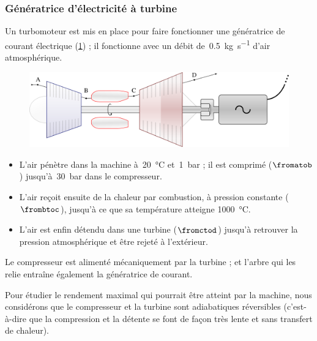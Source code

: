 \subsubsection{Génératrice d’électricité à turbine}
\label{exo_generatrice_electricite_turbine}

	Un turbomoteur est mis en place pour faire fonctionner une génératrice de courant électrique (\cref{fig_exo_turbomoteur}) ; il fonctionne avec un débit de~\SI{0,5}{\kilogram\per\second} d’air atmosphérique.
	
	\begin{figure}
		\begin{center}
		\includegraphics[width=\textwidth]{images/turbomoteur_generatrice.png}
		\end{center}
		\label{fig_exo_turbomoteur}
	\end{figure}
		
	\begin{itemize}
		\item L’air pénètre dans la machine à~\SI{20}{\degreeCelsius} et~\SI{1}{\bar} ; il est comprimé ($\fromatob$) jusqu’à~\SI{30}{\bar} dans le compresseur.	
		\item L’air reçoit ensuite de la chaleur par combustion, à pression constante ($\frombtoc$), jusqu’à ce que sa température atteigne \SI{1000}{\degreeCelsius}.	
		\item L’air est enfin détendu dans une turbine ($\fromctod$) jusqu’à retrouver la pression atmosphérique et être rejeté à l’extérieur.
	\end{itemize}
	
	Le compresseur est alimenté mécaniquement par la turbine ; et l’arbre qui les relie entraîne également la génératrice de courant.
	
	Pour étudier le rendement maximal qui pourrait être atteint par la machine, nous considérons que le compresseur et la turbine sont adiabatiques réversibles (c’est-à-dire que la compression et la détente se font de façon très lente et sans transfert de chaleur).

